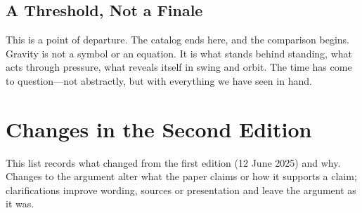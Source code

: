 \documentclass[11pt,a4paper]{article}
\begin{document}
\subsection{A Threshold, Not a Finale}

This is a point of departure. The catalog ends here, and the comparison begins. Gravity is not a symbol or an equation. It is what stands behind standing, what acts through pressure, what reveals itself in swing and orbit. The time has come to question---not abstractly, but with everything we have seen in hand.

\clearpage
\section*{Changes in the Second Edition}

This list records what changed from the first edition (12 June 2025) and why. Changes to the argument alter what the paper claims or how it supports a claim; clarifications improve wording, sources or presentation and leave the argument as it was.
\end{document}
